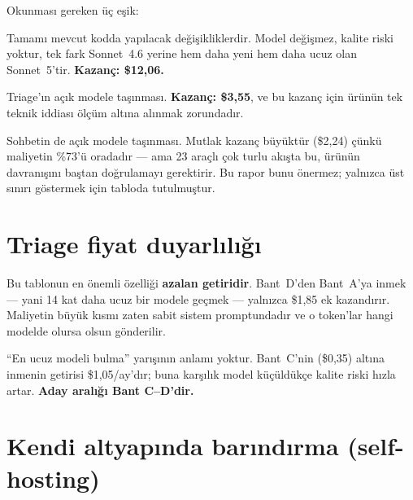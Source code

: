 \documentclass[11pt,a4paper]{article}
\newenvironment{keybox}
  {\begin{center}\begin{lrbox}{\kbox}\begin{minipage}{0.90\textwidth}\color{ink}\small}
  {\end{minipage}\end{lrbox}\setlength{\fboxsep}{11pt}\colorbox{soft}{\usebox{\kbox}}\end{center}}
\begin{document}
Okunması gereken üç eşik:

\begin{description}[leftmargin=0pt,style=unboxed,itemsep=5pt]
  \item[S0 $\rightarrow$ S4: \$19{,}30 $\rightarrow$ \$7{,}24.] Tamamı mevcut kodda
        yapılacak değişikliklerdir. Model değişmez, kalite riski yoktur, tek fark
        Sonnet~4.6 yerine hem daha yeni hem daha ucuz olan Sonnet~5'tir.
        \textbf{Kazanç: \$12{,}06.}
  \item[S4 $\rightarrow$ S6: \$7{,}24 $\rightarrow$ \$3{,}69.] Triage'ın açık modele
        taşınması. \textbf{Kazanç: \$3{,}55}, ve bu kazanç için ürünün tek teknik iddiası
        ölçüm altına alınmak zorundadır.
  \item[S7 $\rightarrow$ S8: \$3{,}32 $\rightarrow$ \$1{,}08.] Sohbetin de açık modele
        taşınması. Mutlak kazanç büyüktür (\$2{,}24) çünkü maliyetin \%73'ü oradadır ---
        ama 23 araçlı çok turlu akışta bu, ürünün davranışını baştan doğrulamayı gerektirir.
        Bu rapor bunu önermez; yalnızca üst sınırı göstermek için tabloda tutulmuştur.
\end{description}

\section{Triage fiyat duyarlılığı}

\begin{table}[h]
\centering\small

\caption{Orta profil (50 mail/gün). ``Tasarruf'' Haiku 4.5'e göredir.}
\end{table}

Bu tablonun en önemli özelliği \textbf{azalan getiridir}. Bant~D'den Bant~A'ya inmek ---
yani 14 kat daha ucuz bir modele geçmek --- yalnızca \$1{,}85 ek kazandırır. Maliyetin
büyük kısmı zaten sabit sistem promptundadır ve o token'lar hangi modelde olursa olsun
gönderilir.

\begin{keybox}
``En ucuz modeli bulma'' yarışının anlamı yoktur. Bant~C'nin (\$0{,}35) altına inmenin
getirisi \$1{,}05/ay'dır; buna karşılık model küçüldükçe kalite riski hızla artar.
\textbf{Aday aralığı Bant C--D'dir.}
\end{keybox}

\section{Kendi altyapında barındırma (self-hosting)}
\end{document}
